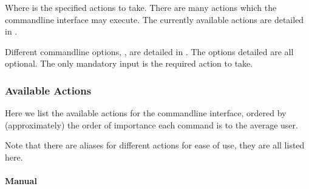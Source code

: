 \documentclass[letterpaper,11pt,english]{sphinxmanual}
\begin{document}
\sphinxAtStartPar
Where {\hyperref[\detokenize{user/command_line:cmdoption-arg-action}]{\sphinxcrossref{\sphinxcode{\sphinxupquote{{[}action{]}}}}}} is the specified actions to take. There are many
actions which the command\sphinxhyphen{}line interface may execute. The currently available
actions are detailed in {\hyperref[\detokenize{user/command_line:user-command-line-available-actions}]{}}.

\sphinxAtStartPar
Different command\sphinxhyphen{}line options, {\hyperref[\detokenize{user/command_line:cmdoption-arg-options}]{\sphinxcrossref{\sphinxcode{\sphinxupquote{{[}options{]}}}}}}, are detailed in {\hyperref[\detokenize{user/command_line:user-command-line-available-options}]{}}. The options detailed are all
optional. The only mandatory input is the required action to take.


\subsubsection{Available Actions}
\label{\detokenize{user/command_line:available-actions}}\label{\detokenize{user/command_line:user-command-line-available-actions}}

\begin{savenotes}\begin{fulllineitems}
\label{\detokenize{user/command_line:cmdoption-arg-action}}
\pysigstartsignatures
\pysigline{\sphinxbfcode{\sphinxupquote{{[}action{]}}}\sphinxcode{\sphinxupquote{}}}
\pysigstopsignatures
\end{fulllineitems}\end{savenotes}


\sphinxAtStartPar
Here we list the available actions for the command\sphinxhyphen{}line interface, ordered by
(approximately) the order of importance each command is to the average user.

\sphinxAtStartPar
Note that there are aliases for different actions for ease of use, they
are all listed here.


\paragraph{Manual}
\label{\detokenize{user/command_line:manual}}\label{\detokenize{user/command_line:user-command-line-available-actions-manual}}
\end{document}
